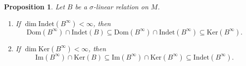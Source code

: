\documentclass[12pt]{amsart}
\newtheorem{proposition}[theorem]{Proposition}
\theoremstyle{definition}
\newcommand{\<}{\langle}   %
\renewcommand{\>}{\rangle} %
\begin{document}
\begin{proposition}\label{PropStableKernelIndet}
Let $B$ be a $\sigma$-linear relation on $M$. 
\begin{enumerate}
    \item If $\dim\mathrm{Indet}(B^{\infty}) < \infty$, then 
    \begin{equation*}
        \mathrm{Dom}(B^{\infty}) \cap \mathrm{Indet}(B) \subseteq  \mathrm{Dom}(B^{\infty}) \cap \mathrm{Indet}(B^{\infty}) \subseteq  \mathrm{Ker}(B^{\infty}).
    \end{equation*}
    \item If $\dim \mathrm{Ker}(B^{\infty}) < \infty$, then 
    \begin{equation*}
        \mathrm{Im}(B^{\infty}) \cap \mathrm{Ker}(B) \subseteq  \mathrm{Im}(B^{\infty}) \cap \mathrm{Ker}(B^{\infty}) \subseteq  \mathrm{Indet}(B^{\infty}).
    \end{equation*}
\end{enumerate}
\end{proposition}
\end{document}
